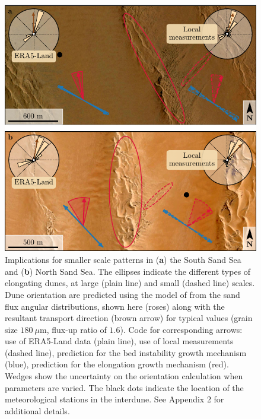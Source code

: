 \begin{figure}
\centering
\includegraphics[scale=1]{Figures/Figure9.pdf}
\caption{Implications for smaller scale patterns in (\textbf{a}) the South Sand Sea and (\textbf{b}) North Sand Sea. The ellipses indicate the different types of elongating dunes, at large (plain line) and small (dashed line) scales. Dune orientation are predicted using the model of \citet{Courrech2014} from the sand flux angular distributions, shown here (roses) along with the resultant transport direction (brown arrow) for typical values (grain size $180~\mu$m, flux-up ratio of $1.6$). Code for corresponding arrows: use of ERA5-Land data (plain line), use of local measurements (dashed line), prediction for the bed instability growth mechanism (blue), prediction for the elongation growth mechanism (red). Wedges show the uncertainty on the orientation calculation when parameters are varied. The black dots indicate the location of the meteorological stations in the interdune. See Appendix 2 for additional details.}
\label{Fig9}
\end{figure}


